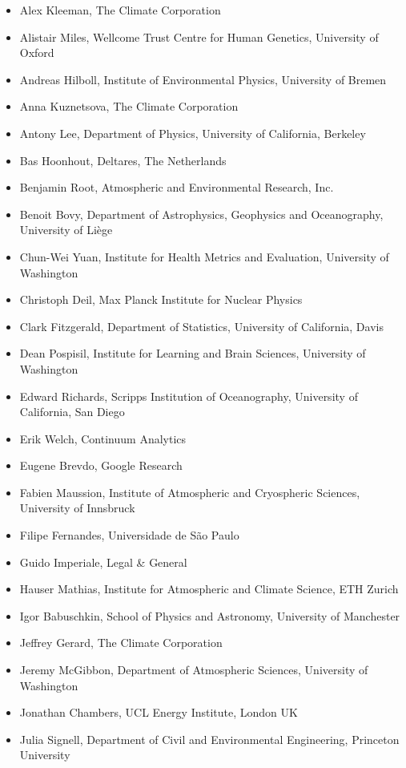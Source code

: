 \documentclass{jors}
\begin{document}
\begin{itemize}
\item Alex Kleeman, The Climate Corporation
\item Alistair Miles, Wellcome Trust Centre for Human Genetics, University of Oxford
\item Andreas Hilboll, Institute of Environmental Physics, University of Bremen
\item Anna Kuznetsova, The Climate Corporation
\item Antony Lee, Department of Physics, University of California, Berkeley
\item Bas Hoonhout, Deltares, The Netherlands
\item Benjamin Root, Atmospheric and Environmental Research, Inc.
\item Benoit Bovy, Department of Astrophysics, Geophysics and Oceanography, University of Liège
\item Chun-Wei Yuan, Institute for Health Metrics and Evaluation, University of Washington
\item Christoph Deil, Max Planck Institute for Nuclear Physics
\item Clark Fitzgerald, Department of Statistics, University of California, Davis
\item Dean Pospisil, Institute for Learning and Brain Sciences, University of Washington
\item Edward Richards, Scripps Institution of Oceanography, University of California, San Diego
\item Erik Welch, Continuum Analytics
\item Eugene Brevdo, Google Research
\item Fabien Maussion, Institute of Atmospheric and Cryospheric Sciences, University of Innsbruck
\item Filipe Fernandes, Universidade de São Paulo
\item Guido Imperiale, Legal \& General
\item Hauser Mathias, Institute for Atmospheric and Climate Science, ETH Zurich
\item Igor Babuschkin, School of Physics and Astronomy, University of Manchester
\item Jeffrey Gerard, The Climate Corporation
\item Jeremy McGibbon, Department of Atmospheric Sciences, University of Washington
\item Jonathan Chambers, UCL Energy Institute, London UK
\item Julia Signell, Department of Civil and Environmental Engineering, Princeton University

\end{itemize}
\end{document}
